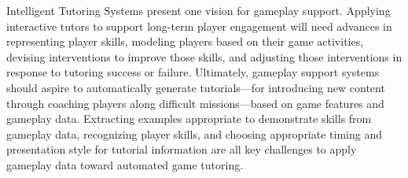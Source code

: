 \documentclass[conference]{IEEEtran}
\begin{document}

Intelligent Tutoring Systems \cite{vanlehn2006:behav-its} present one vision for gameplay support. 
Applying interactive tutors to support long-term player engagement will need advances in representing player skills, modeling players based on their game activities, devising interventions to improve those skills, and adjusting those interventions in response to tutoring success or failure. 
Ultimately, gameplay support systems should aspire to automatically generate tutorials---for introducing new content through coaching players along difficult missions---based on game features and gameplay data. 
Extracting examples appropriate to demonstrate skills from gameplay data, recognizing player skills, and choosing appropriate timing and presentation style for tutorial information are all key challenges to apply gameplay data toward automated game tutoring.

%
\end{document}
